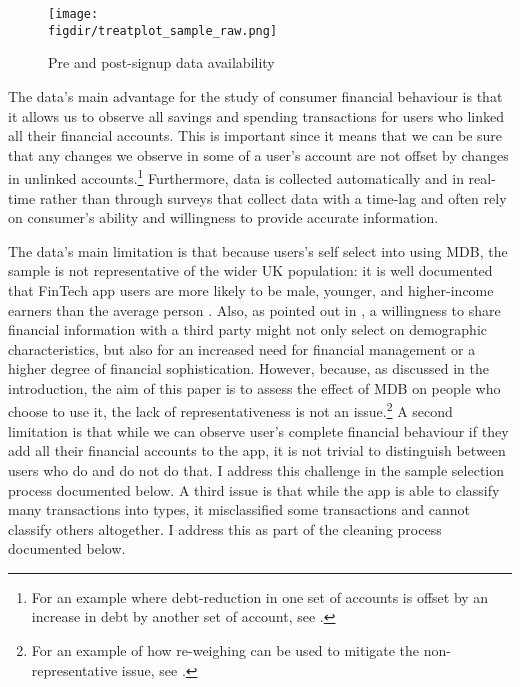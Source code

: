 \begin{figure}[h]
\centering
\caption{Pre and post-signup data availability}%
\texttt{[image: \\figdir/treatplot\_sample\_raw.png]}
\label{fig:treatplot}
\end{figure}

The data's main advantage for the study of consumer financial behaviour is that
it allows us to observe all savings and spending transactions for users who
linked all their financial accounts. This is important since it means that we
can be sure that any changes we observe in some of a user's account are not
offset by changes in unlinked accounts.\footnote{For an example where debt-reduction in
one set of accounts is offset by an increase in debt by another set of account,
see \citet{medina2021side}.} Furthermore, data is collected automatically and
in real-time rather than through surveys that collect data with a time-lag and
often rely on consumer's ability and willingness to provide accurate
information.

The data's main limitation is that because users's self select into using MDB,
the sample is not representative of the wider UK population: it is well
documented that FinTech app users are more likely to be male, younger, and
higher-income earners than the average person \citet{carlin2019generational}.
Also, as pointed out in \citet{gelman2014harnessing}, a willingness to share
financial information with a third party might not only select on demographic
characteristics, but also for an increased need for financial management or a
higher degree of financial sophistication. However, because, as discussed in
the introduction, the aim of this paper is to assess the effect of MDB on
people who choose to use it, the lack of representativeness is not an
issue.\footnote{For an example of how re-weighing can be used to mitigate the
non-representative issue, see \citet{bourquin2020effects}.} A second limitation
is that while we can observe user's complete financial behaviour if they add
all their financial accounts to the app, it is not trivial to distinguish
between users who do and do not do that. I address this challenge in the sample
selection process documented below. A third issue is that while the app is able
to classify many transactions into types, it misclassified some transactions
and cannot classify others altogether. I address this as part of the cleaning
process documented below.

